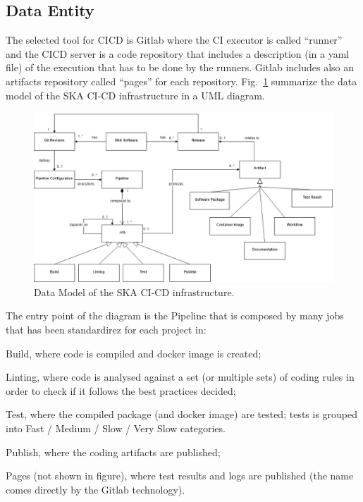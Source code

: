 \documentclass[a4paper,
               keeplastbox,   %
               ]{jacow}
\begin{document}
\subsection{Data Entity}
The selected tool for CICD is Gitlab where the CI executor is called “runner” and the CICD server is a code repository that includes a description (in a yaml file) of the execution that has to be done by the runners. Gitlab includes also an artifacts repository called “pages” for each repository. Fig.~\ref{fig:datamodel} summarize the data model of the SKA CI-CD infrastructure in a UML diagram.

\begin{figure}[!htb]
   \centering
   \includegraphics*[width=1\columnwidth]{dataEntity}
   \caption{Data Model of the SKA CI-CD infrastructure.}
   \label{fig:datamodel}
\end{figure}

The entry point of the diagram is the Pipeline that is composed by many jobs that has been standardirez for each project in:
\begin{Itemize}
    \item Build, where code is compiled and docker image is created;
    \item Linting, where code is analysed against a set (or multiple sets) of coding rules in order to check if it follows the best practices decided;
    \item Test, where the compiled package (and docker image) are tested; tests is grouped into Fast / Medium / Slow / Very Slow categories.
    \item Publish, where the coding artifacts are published;
    \item Pages (not shown in figure), where test results and logs are published (the name comes directly by the Gitlab technology). 
\end{Itemize}
\end{document}

